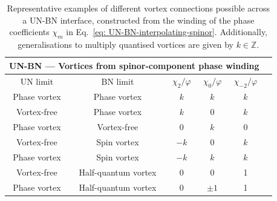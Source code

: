 \begin{table}
    \centering
    \begin{tabular}{cccccc}
        \toprule
        \multicolumn{5}{c}{UN-BN --- Vortices from spinor-component phase
        winding} \\
        \midrule
        UN limit & BN limit &  \(\chi_2/\varphi \) & \(\chi_0/\varphi \) &
        \(\chi_{-2}/\varphi \)  \\
        \midrule
        Phase vortex & Phase vortex & \(k\) & \(k\) &
         \(k\) \\ 
         Vortex-free & Phase vortex & \(k\) & 0 & \(k\) \\
        Phase vortex & Vortex-free & 0 & \(k\) & 0\\
         Vortex-free & Spin vortex  & \(-k\) & 0 & \(k\) \\
        Phase vortex & Spin vortex  & \(-k\) & \(k\) &
         \(k\) \\
         Vortex-free & Half-quantum vortex  & 0 & 0 & 1 \\
        Phase vortex & Half-quantum vortex  & 0 & \(\pm 1\) & 1 \\
        \bottomrule
    \end{tabular}
    \caption[Examples of possible vortex connections across a uniaxial nematic
    to biaxial nematic interface]{\label{tab: UN-BN-vortices}
    Representative examples of different vortex connections possible across a
    UN-BN interface, constructed from the winding of the phase coefficients
    \(\chi_m\) in Eq.~\eqref{eq: UN-BN-interpolating-spinor}.
    Additionally, generalisations to multiply quantised vortices are given by
    \(k \in \mathbb{Z}\).}
\end{table}

